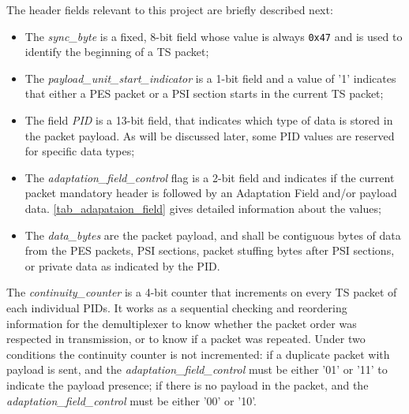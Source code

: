 \documentclass[12pt,a4paper]{article}
\begin{document}
The header fields relevant to this project are briefly described next:
\begin{itemize}
\item{The \textit{sync\hspace{0.1mm}\_\hspace{0.1mm}byte} is a fixed, 8-bit field whose value is always \texttt{0x47} and is used to identify the beginning of a TS packet;}
\item{ The \textit{payload\hspace{0.1mm}\_\hspace{0.1mm}unit\hspace{0.1mm}\_\hspace{0.1mm}start\hspace{0.1mm}\_\hspace{0.1mm}indicator} is a 1-bit field and a value of '1' indicates that either a PES packet or a PSI section starts in the current TS packet;}
\item{The field \textit{PID} is a 13-bit field, that indicates which type of data is stored in the packet payload. As will be discussed later, some PID values are reserved for specific data types;}
\item{The \textit{adaptation\hspace{0.1mm}\_\hspace{0.1mm}field\hspace{0.1mm}\_\hspace{0.1mm}control} flag is a 2-bit field and indicates if the current packet mandatory header is followed by an Adaptation Field and/or payload data. \autoref{tab_adapataion_field} gives detailed information about the values;}
\item{The \textit{data\hspace{0.1mm}\_\hspace{0.1mm}bytes} are the packet payload, and shall be contiguous bytes of data from the PES packets, PSI sections, packet stuffing bytes after PSI sections, or private data as indicated by the PID.}
 \end{itemize}

The \textit{continuity\hspace{0.1mm}\_\hspace{0.1mm}counter} is a 4-bit counter that increments on every TS packet of each individual PIDs. It works as a sequential checking and reordering information for the demultiplexer to know whether the packet order was respected in transmission, or to know if a packet was repeated. Under two conditions the continuity counter is not incremented: if a duplicate packet with payload is sent, and the \textit{adaptation\hspace{0.1mm}\_\hspace{0.1mm}field\hspace{0.1mm}\_\hspace{0.1mm}control} must be either '01' or '11' to indicate the payload presence; if there is no payload in the packet, and the \textit{adaptation\hspace{0.1mm}\_\hspace{0.1mm}field\hspace{0.1mm}\_\hspace{0.1mm}control} must be either '00' or '10'.
 
\end{document}
